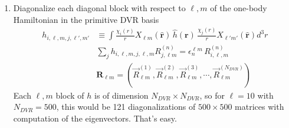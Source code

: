 \documentclass[%
pra%
,twocolumn%
,amssymb, nobibnotes, aps,
longbibliography
]{revtex4-1}
\begin{document}
\begin{enumerate}
\item{ Diagonalize each diagonal block with respect to $\ell, m$ of the one-body Hamiltonian in the primitive DVR basis
\begin{equation}
\begin{split}
 h_{i,\ell,m, j, \ell',m'} &\equiv \int \frac{\chi_i(r)}{r} X_{\ell m}(\mathbf{\hat{r}}) \, \hat{h}(\mathbf{r}) \,  \frac{\chi_j(r)}{r} X_{\ell' m'}(\mathbf{\hat{r}}) d^3r\\
& \sum_{j}h_{i,\ell,m, j, \ell,m} R^{(n)}_{j,\ell m} = \epsilon_{n}^{\ell m} \, R^{(n)}_{i,\ell, m} \\
&\mathbf{R}_{\ell m} = \left(  \vec{R}^{(1)}_{\ell m},  \vec{R}^{(2)}_{\ell m},  \vec{R}^{(3)}_{\ell m}, \cdots, \vec{R}^{(N_{DVR})}_{\ell m} \right)
 \end{split}
\end{equation}
Each $\ell,m$ block of $h$ is of dimension $N_{DVR} \times N_{DVR}$, so for $\ell = 10$ with $N_{DVR} = 500$, this would be 121 diagonalizations of $500 \times 500$ matrices with computation of the eigenvectors.  That's easy.

}
\end{enumerate}
\end{document}
